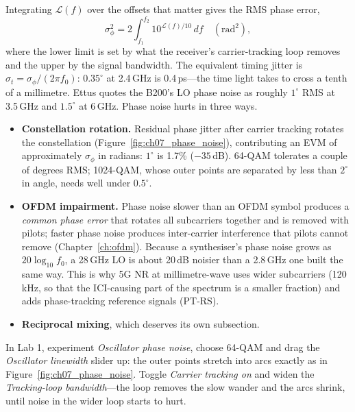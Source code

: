Integrating $\mathcal{L}(f)$ over the offsets that matter gives the RMS phase error,
\begin{equation}
\sigma_\phi^2=2\int_{f_1}^{f_2}10^{\mathcal{L}(f)/10}\,df\quad(\text{rad}^2),
\label{eq:ch07:pnint}
\end{equation}
where the lower limit is set by what the receiver's carrier-tracking loop removes and the upper by the
signal bandwidth. The equivalent timing jitter is $\sigma_t=\sigma_\phi/(2\pi f_0)$: $0.35^\circ$ at
2.4\,GHz is 0.4\,ps---the time light takes to cross a tenth of a millimetre. Ettus quotes the B200's LO
phase noise as roughly $1^\circ$ RMS at 3.5\,GHz and $1.5^\circ$ at 6\,GHz. Phase noise hurts in three ways.
\begin{itemize}
\item \textbf{Constellation rotation.} Residual phase jitter after carrier tracking rotates the
constellation (Figure~\ref{fig:ch07_phase_noise}), contributing an EVM of approximately
$\sigma_\phi$ in radians: $1^\circ$ is 1.7\% ($-35$\,dB). 64-QAM tolerates a couple of degrees RMS;
1024-QAM, whose outer points are separated by less than $2^\circ$ in angle, needs well under $0.5^\circ$.
\item \textbf{OFDM impairment.} Phase noise slower than an OFDM symbol produces a \emph{common phase
error} that rotates all subcarriers together and is removed with pilots; faster phase noise produces
inter-carrier interference that pilots cannot remove (Chapter~\ref{ch:ofdm}). Because a synthesiser's
phase noise grows as $20\log_{10}f_0$, a 28\,GHz LO is about 20\,dB noisier than a 2.8\,GHz one built the
same way. This is why 5G NR at millimetre-wave uses wider subcarriers (120\,kHz, so that the ICI-causing
part of the spectrum is a smaller fraction) and adds phase-tracking reference signals (PT-RS).
\item \textbf{Reciprocal mixing}, which deserves its own subsection.
\end{itemize}


\begin{tryit}
In Lab 1, experiment \emph{Oscillator phase noise}, choose 64-QAM and drag the \emph{Oscillator
linewidth} slider up: the outer points stretch into arcs exactly as in
Figure~\ref{fig:ch07_phase_noise}. Toggle \emph{Carrier tracking on} and widen the
\emph{Tracking-loop bandwidth}---the loop removes the slow wander and the arcs shrink, until noise in
the wider loop starts to hurt.
\end{tryit}


